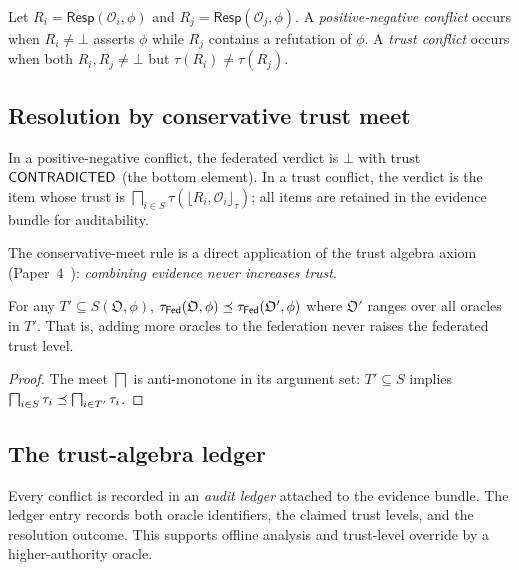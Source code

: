 \documentclass[11pt]{article}
\newcommand{\Oracle}{\mathcal{O}}            %
\newcommand{\OrcSet}{\mathfrak{O}}           %
\newcommand{\Orcl}[1]{\Oracle_{#1}}         %
\newcommand{\tlev}[1]{\tau(#1)}              %
\newcommand{\Fed}{\mathsf{Fed}}             %
\newcommand{\Ceil}[1]{\lfloor #1 \rfloor_{\tau}}   %
\newcommand{\Resp}{\mathsf{Resp}}           %
\begin{document}
\begin{definition}[Conflict]\label{def:conflict}
  Let $R_i = \Resp(\Orcl{i},\phi)$ and $R_j = \Resp(\Orcl{j},\phi)$.
  A \emph{positive-negative conflict} occurs when $R_i \neq \bot$
  asserts $\phi$ while $R_j$ contains a refutation of $\phi$.
  A \emph{trust conflict} occurs when both $R_i, R_j \neq \bot$ but
  $\tlev{R_i} \neq \tlev{R_j}$.
\end{definition}

\subsection{Resolution by conservative trust meet}

\begin{definition}\label{def:resolution}
  In a positive-negative conflict, the federated verdict is $\bot$
  with trust $\mathsf{CONTRADICTED}$ (the bottom element).
  In a trust conflict, the verdict is the item whose trust is
  $\bigsqcap_{i \in S} \tlev{\Ceil{R_i, \Orcl{i}}}$; all items are
  retained in the evidence bundle for auditability.
\end{definition}

The conservative-meet rule is a direct application of the trust algebra
axiom (Paper~4~\cite{jugeo04}):
\emph{combining evidence never increases trust}.

\begin{proposition}\label{prop:monotone}
  For any $T' \subseteq S(\OrcSet,\phi)$,
  $\tau_{\Fed}(\OrcSet,\phi) \tleq \tau_{\Fed}(\OrcSet',\phi)$
  where $\OrcSet'$ ranges over all oracles in $T'$.
  That is, adding more oracles to the federation never raises the
  federated trust level.
\end{proposition}
\begin{proof}
  The meet $\bigsqcap$ is anti-monotone in its argument set:
  $T' \subseteq S$ implies
  $\bigsqcap_{i \in S} \tau_i \preceq \bigsqcap_{i \in T'} \tau_i$.
\end{proof}

\subsection{The trust-algebra ledger}

Every conflict is recorded in an \emph{audit ledger} attached to the
evidence bundle.  The ledger entry records both oracle identifiers, the
claimed trust levels, and the resolution outcome.  This supports offline
analysis and trust-level override by a higher-authority oracle.
\end{document}
